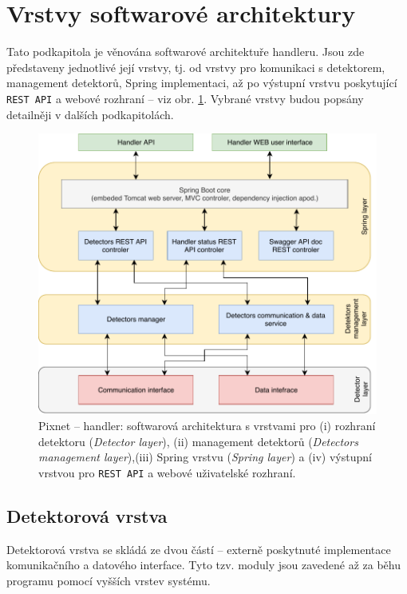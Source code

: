 \section{Vrstvy softwarové architektury}\label{chap:handler:architecture}
Tato podkapitola je věnována softwarové architektuře handleru. Jsou zde představeny jednotlivé její vrstvy, tj. od vrstvy pro komunikaci s detektorem, management detektorů, Spring implementaci, až po výstupní vrstvu poskytující \texttt{REST API} a webové rozhraní -- viz obr. \ref{fig:handler:arch}. Vybrané vrstvy budou popsány detailněji v dalších podkapitolách.

\begin{figure}[th]
	\begin{center}
		\vspace*{0.4cm}
		\includegraphics[width=14cm]{figures/handler_architecture.pdf}
		\caption{Pixnet -- handler: softwarová architektura s vrstvami pro (i) rozhraní detektoru (\textit{Detector layer}), (ii) management detektorů (\textit{Detectors management layer}),(iii) Spring vrstvu (\textit{Spring layer}) a (iv) výstupní vrstvou pro \texttt{REST API} a webové uživatelské rozhraní.}
		\label{fig:handler:arch}
	\end{center}
\end{figure}

\subsection{Detektorová vrstva}\label{chap:handler:detector_layer}
Detektorová vrstva se skládá ze dvou částí -- externě poskytnuté implementace komunikačního a datového interface. Tyto tzv. moduly jsou zavedené až za běhu programu pomocí vyšších vrstev systému.

